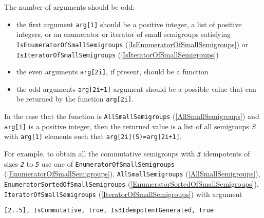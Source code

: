 \documentclass[a4paper,11pt]{report}
\begin{document}
{{ The number of arguments should be odd: 
\begin{itemize}
\item the first argument \texttt{arg[1]} should be a positive integer, a list of positive integers, or an enumerator or
iterator of small semigroups satisfying \texttt{IsEnumeratorOfSmallSemigroups} (\ref{IsEnumeratorOfSmallSemigroups}) or \texttt{IsIteratorOfSmallSemigroups} (\ref{IsIteratorOfSmallSemigroups})
\item  the even arguments \texttt{arg[2i]}, if present, should be a function
\item  the odd arguments \texttt{arg[2i+1]} argument should be a possible value that can be returned by the function \texttt{arg[2i]}.
\end{itemize}
 In the case that the function is \texttt{AllSmallSemigroups} (\ref{AllSmallSemigroups}) and \texttt{arg[1]} is a positive integer, then the returned value is a list of all semigroups $S$ with \texttt{arg[1]} elements such that \texttt{arg[2i](S)=arg[2i+1]}.

 For example, to obtain all the commutative semigroups with \mbox{\texttt{\mdseries\slshape 3}} idempotents of sizes \mbox{\texttt{\mdseries\slshape 2}} to \mbox{\texttt{\mdseries\slshape 5}} use one of \texttt{EnumeratorOfSmallSemigroups} (\ref{EnumeratorOfSmallSemigroups}), \texttt{AllSmallSemigroups} (\ref{AllSmallSemigroups}), \texttt{EnumeratorSortedOfSmallSemigroups} (\ref{EnumeratorSortedOfSmallSemigroups}), \texttt{IteratorOfSmallSemigroups} (\ref{IteratorOfSmallSemigroups}) with argument 
\begin{Verbatim}[commandchars=!@|,fontsize=\small,frame=single,label=Example]
  [2..5], IsCommutative, true, Is3IdempotentGenerated, true
  	

\end{Verbatim}}}
\end{document}
